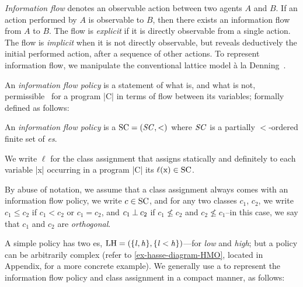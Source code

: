 \emph{Information flow} denotes an observable action
between two agents \(A\) and \(B\). If an action performed by \(A\) is
observable to \(B\), then there exists an information flow from \(A\) to \(B\).
The flow is \emph{explicit} if it is directly
observable from a single action. The flow is \emph{implicit} when it is not directly observable, but reveals deductively the
initial performed action, after a sequence of other actions. To represent
information flow, we manipulate the conventional lattice model à
la Denning~\cite{denning76}.

An \emph{information flow policy} is a statement
of what is, and what is not, permissible~\cite{bishop2003} for a program
\prc|C| in terms of flow between its variables; formally defined as
follows:

\begin{definition}\label{def:ifp} An \emph{information flow policy} is a  \(\mathrm{SC} = (\mathit{SC}, <)\) where
\(\mathit{SC}\) is a partially \(<\)-ordered finite set of \emph{es}.

We write \(\ell\) for the class assignment that assigns
statically and definitely to each variable \prc|x| occurring in a program
\prc|C| its  \(\lvl{\prc|x|} \in
\SC\). \end{definition}

By abuse of notation, we assume that a class assignment always comes with an
information flow policy, we write \(c \in
\mathrm{SC}\), and for any two classes
\(c_1\), \(c_2\), we write \(c_1 \leqslant c_2\) if \(c_1 < c_2\) or \(c_1 =
c_2\), and \(c_1 \mathbin{\bot} c_2\) if  \(c_1 \nleqslant c_2\) and \(c_2 \nleqslant
c_1\)--in this case, we say that \(c_1\) and \(c_2\) are \emph{orthogonal}.

A simple policy has two es,
\eg \(\mathrm{LH}=(\{\mathit{l}, \mathit{h}\}, \{\mathit{l} < \mathit{h}\})\)---for \emph{low} and
\emph{high}; but a policy can be arbitrarily complex (refer to
\autoref{ex-hasse-diagram-HMO}, located in Appendix, for a more concrete
example). We generally use a  to represent the information
flow policy and class assignment in a compact
manner, as follows:

